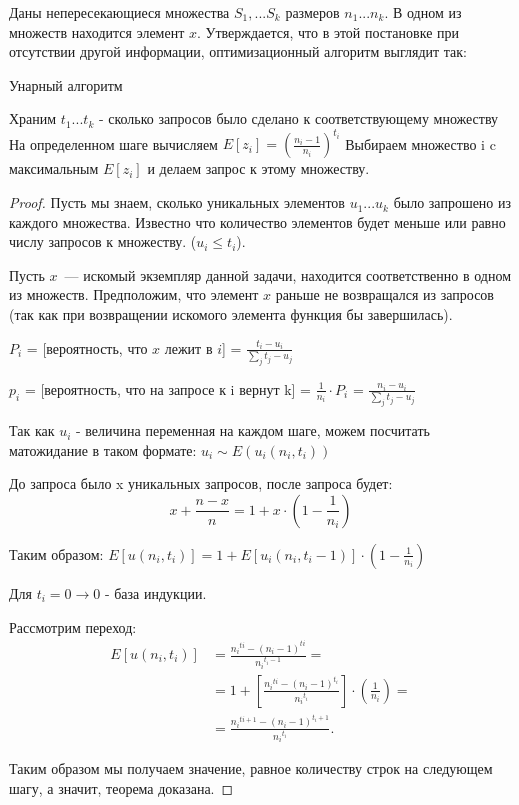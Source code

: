 \begin{myth}
Даны непересекающиеся множества $S_1, ... S_k$ размеров $n_1 ... n_k$.
В одном из множеств находится элемент $x$. Утверждается, что в этой постановке при отсутствии другой информации, оптимизационный алгоритм выглядит так: 
\begin{algorithm}[H]
\caption{Унарный алгоритм}\label{lst1}
\begin{algorithmic}
	    \State Храним $t_1 ... t_k$ - сколько запросов было сделано к соответствующему множеству
	    \State На определенном шаге вычисляем $E[z_i] = (\frac{n_i - 1}{n_i})^{t_i}$
	    \State Выбираем множество i c максимальным $E[z_i]$ и делаем запрос к этому множеству.
	    \EndFor
\end{algorithmic}
\end{algorithm}
\end{myth}
\begin{proof}
    Пусть мы знаем, сколько уникальных элементов $u_1...u_k$ было запрошено из каждого множества. Известно что количество элементов будет меньше или равно числу запросов к множеству. ($u_i \leq t_i$). 
    
    Пусть $x$~--- искомый экземпляр данной задачи, находится соответственно в одном из множеств. Предположим, что элемент $x$ раньше не возвращался из запросов (так как при возвращении искомого элемента 
    функция бы завершилась).
        
    $P_i$ = [вероятность, что $x$ лежит в $i$] = $\frac{t_i - u_i}{\sum_{j}{t_j - u_j}}$ 
    
    $p_i$ = [вероятность, что на запросе к i вернут k] = $\frac{1}{n_i} \cdot P_i$ = $\frac{n_i - u_i}{\sum_{j}{t_j - u_j}}$
    
    Так как $u_i$ - величина переменная на каждом шаге, можем посчитать матожидание в таком формате: $u_i \sim E(u_i(n_i, t_i))$
    
    До запроса было x уникальных запросов, после запроса будет: $$x + \frac{n - x}{n} = 1 + x \cdot (1 - \frac{1}{n_i})$$ 
    
    Таким образом: $E[u(n_i, t_i)] = 1 + E[u_i(n_i, t_{i} - 1)] \cdot (1 - \frac{1}{n_i})$
    
    Для $t_i = 0 \to 0$ - база индукции.
    
    Рассмотрим переход: 
    \begin{align*}
    E[u(n_i, t_i)] &= \frac{{n_i}^{ti} - {(n_i - 1)}^{ti}}{{n_i}^{t_i - 1}} = \\
                   &= 1 + [ \frac{{n_i}^{ti} - {(n_i - 1)}^{t_i}}{{n_i}^{t_i}} ] \cdot (\frac{1}{n_i}) = \\
                   &= \frac{{n_i}^{ti + 1} - {(n_i - 1)}^{t_i + 1}}{{n_i}^{t_i}}.
    \end{align*}
    
    Таким образом мы получаем значение, равное количеству строк на следующем шагу, а значит, теорема доказана.

\end{proof}

